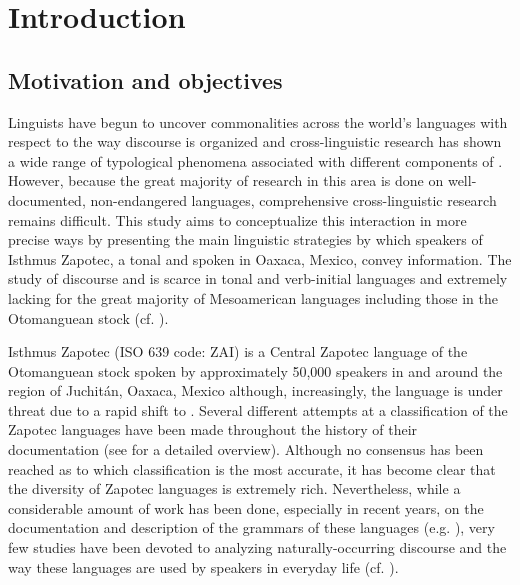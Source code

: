 \chapter{Introduction}

\section{Motivation and objectives}

Linguists have begun to uncover commonalities across the world's languages with respect to the way discourse is organized and cross-linguistic research has shown a wide range of typological phenomena associated with different components of  \citep{bernini2006,mereu2009,erteschik2007}. However, because the great majority of research in this area is done on well-documented, non-endangered languages, comprehensive cross-linguistic research remains difficult. This study aims to conceptualize this interaction in more precise ways by presenting the main linguistic strategies by which speakers of Isthmus Zapotec, a tonal and  spoken in Oaxaca, Mexico, convey information. The study of discourse and  is scarce in tonal and verb-initial languages and extremely lacking for the great majority of Mesoamerican languages including those in the Otomanguean stock (cf. \citealt{camacho2010,lillehaugen2008,lillehaugen2016}). 

Isthmus Zapotec (ISO 639 code: ZAI) is a Central Zapotec language of the Otomanguean stock spoken by approximately 50,000 speakers in and around the region of Juchit\'{a}n, Oaxaca, Mexico although, increasingly, the language is under threat due to a rapid shift to . Several different attempts at a classification of the Zapotec languages have been made throughout the history of their documentation (see \citealt{smithstark2003,campbell2017a,campbell2017b} for a detailed overview). Although no consensus has been reached as to which classification is the most accurate, it has become clear that the diversity of Zapotec languages is extremely rich. Nevertheless, while a considerable amount of work has been done, especially in recent years, on the documentation and description of the grammars of these languages (e.g. \citealt{avelino2004,beamdeazcona2004,sonnenschein2005}), very few studies have been devoted to analyzing naturally-occurring discourse and the way these languages are used by speakers in everyday life (cf. \citealt{castillo2014}).

